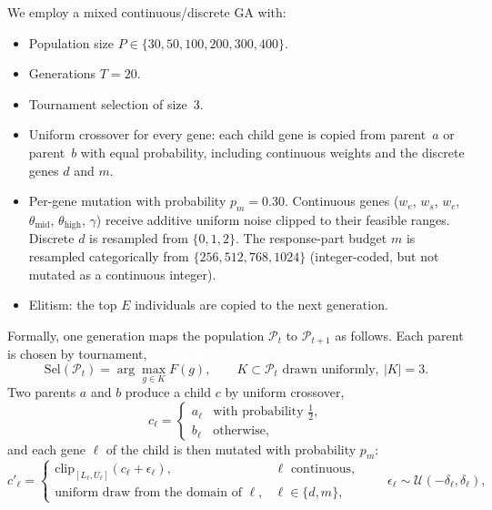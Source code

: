 \documentclass[mathematics,article,submit,xetex,moreauthors]{Definitions/mdpi}
\begin{document}
We employ a mixed continuous/discrete GA with:
\begin{itemize}
  \item Population size
        \(P \in \{30, 50, 100, 200, 300, 400\}\).
  \item Generations $T = 20$.
  \item Tournament selection of size~3.
  \item Uniform crossover for every gene: each child gene is copied from
        parent~$a$ or parent~$b$ with equal probability, including continuous
        weights and the discrete genes \(d\) and \(m\).
  \item Per-gene mutation with probability $p_m = 0.30$. Continuous genes
        ($w_e$, $w_s$, $w_c$, $\theta_{\mathrm{mid}}$,
        $\theta_{\mathrm{high}}$, $\gamma$) receive additive uniform noise
        clipped to their feasible ranges. Discrete \(d\) is resampled from
        \(\{0,1,2\}\). The response-part budget \(m\) is resampled
        categorically from \(\{256, 512, 768, 1024\}\) (integer-coded, but
        not mutated as a continuous integer).
  \item Elitism: the top \(E\) individuals are copied to the next generation.
\end{itemize}
Formally, one generation maps the population $\mathcal{P}_t$ to
$\mathcal{P}_{t+1}$ as follows. Each parent is chosen by tournament,
\begin{equation}
\label{eq:ga-select}
  \mathrm{Sel}(\mathcal{P}_t) = \arg\max_{g \in K} F(g),
  \qquad K \subset \mathcal{P}_t \text{ drawn uniformly}, \ |K| = 3.
\end{equation}
Two parents $a$ and $b$ produce a child $c$ by uniform crossover,
\begin{equation}
\label{eq:ga-cross}
  c_\ell =
  \begin{cases}
    a_\ell & \text{with probability } \tfrac12,\\
    b_\ell & \text{otherwise},
  \end{cases}
\end{equation}
and each gene $\ell$ of the child is then mutated with probability $p_m$:
\begin{equation}
\label{eq:ga-vary}
  c'_\ell =
  \begin{cases}
    \mathrm{clip}_{[L_\ell, U_\ell]}(c_\ell + \epsilon_\ell),
      & \ell \text{ continuous},\\
    \text{uniform draw from the domain of } \ell, & \ell \in \{d, m\},
  \end{cases}
  \qquad \epsilon_\ell \sim \mathcal{U}(-\delta_\ell, \delta_\ell),
\end{equation}
\end{document}
